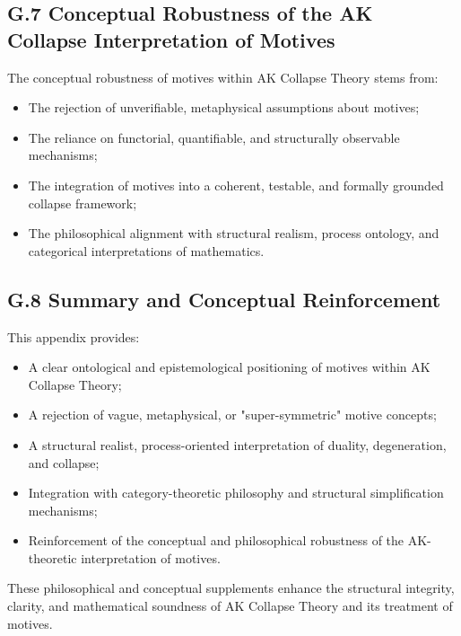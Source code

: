 \documentclass[11pt]{article}
\begin{document}
\subsection*{G.7 Conceptual Robustness of the AK Collapse Interpretation of Motives}

The conceptual robustness of motives within AK Collapse Theory stems from:

\begin{itemize}
    \item The rejection of unverifiable, metaphysical assumptions about motives;
    \item The reliance on functorial, quantifiable, and structurally observable mechanisms;
    \item The integration of motives into a coherent, testable, and formally grounded collapse framework;
    \item The philosophical alignment with structural realism, process ontology, and categorical interpretations of mathematics.
\end{itemize}

\subsection*{G.8 Summary and Conceptual Reinforcement}

This appendix provides:

\begin{itemize}
    \item A clear ontological and epistemological positioning of motives within AK Collapse Theory;
    \item A rejection of vague, metaphysical, or "super-symmetric" motive concepts;
    \item A structural realist, process-oriented interpretation of duality, degeneration, and collapse;
    \item Integration with category-theoretic philosophy and structural simplification mechanisms;
    \item Reinforcement of the conceptual and philosophical robustness of the AK-theoretic interpretation of motives.
\end{itemize}

These philosophical and conceptual supplements enhance the structural integrity, clarity, and mathematical soundness of AK Collapse Theory and its treatment of motives.

\FloatBarrier
\end{document}
